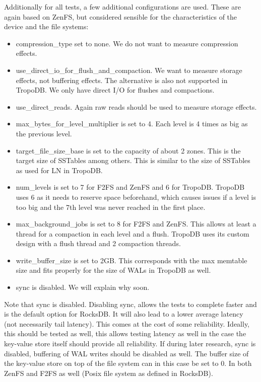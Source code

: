 Additionally for all tests, a few additional configurations are used. These are again based on ZenFS, but considered sensible for the characteristics of the device and the file systems:
\begin{itemize}
    \item compression\_type set to none. We do not want to measure compression effects.
    \item use\_direct\_io\_for\_flush\_and\_compaction. We want to measure storage effects, not buffering effects. The alternative is also not supported in TropoDB. We only have direct I/O for flushes and compactions.
    \item use\_direct\_reads. Again raw reads should be used to measure storage effects.
    \item max\_bytes\_for\_level\_multiplier is set to 4. Each level is 4 times as big as the previous level. 
    \item target\_file\_size\_base is set to the capacity of about 2 zones. This is the target size of SSTables among others. This is similar to the size of SSTables as used for LN in TropoDB.
    \item num\_levels is set to 7 for F2FS and ZenFS and 6 for TropoDB. TropoDB uses 6 as it needs to reserve space beforehand, which causes issues if a level is too big and the 7th level was never reached in the first place.
    \item max\_background\_jobs is set to 8 for F2FS and ZenFS. This allows at least a thread for a compaction in each level and a flush. TropoDB uses its custom design with a flush thread and 2 compaction threads.
    \item write\_buffer\_size is set to 2GB. This corresponds with the max memtable size and fits properly for the size of WALs in TropoDB as well.
    \item sync is disabled. We will explain why soon.
\end{itemize}

Note that sync is disabled. Disabling sync, allows the tests to complete faster and is the default option for RocksDB. It will also lead to a lower average latency (not necessarily tail latency). This comes at the cost of some reliability. Ideally, this should be tested as well, this allows testing latency as well in the case the key-value store itself should provide all reliability. If during later research, sync is disabled, buffering of WAL writes should be disabled as well. The buffer size of the key-value store on top of the file system can in this case be set to 0. In both ZenFS and F2FS as well (Posix file system as defined in RocksDB).


